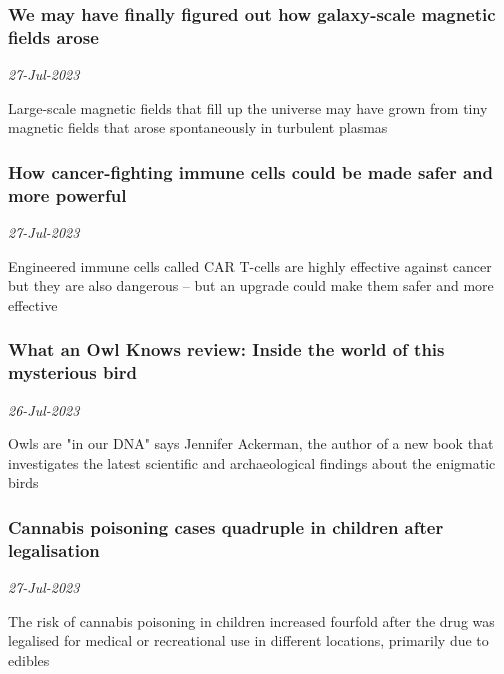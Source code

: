 \subsubsection{We may have finally figured out how galaxy-scale magnetic fields arose \href{https://www.newscientist.com/article/2384429-we-may-have-finally-figured-out-how-galaxy-scale-magnetic-fields-arose/?utm_campaign=RSS%7CNSNS&utm_source=NSNS&utm_medium=RSS&utm_content=home}{}}
\textit{27-Jul-2023}

Large-scale magnetic fields that fill up the universe may have grown from tiny magnetic fields that arose spontaneously in turbulent plasmas
\subsubsection{How cancer-fighting immune cells could be made safer and more powerful \href{https://www.newscientist.com/article/2383957-how-cancer-fighting-immune-cells-could-be-made-safer-and-more-powerful/?utm_campaign=RSS%7CNSNS&utm_source=NSNS&utm_medium=RSS&utm_content=home}{\ding{225}}}
\textit{27-Jul-2023}

Engineered immune cells called CAR T-cells are highly effective against cancer but they are also dangerous – but an upgrade could make them safer and more effective
\subsubsection{What an Owl Knows review: Inside the world of this mysterious bird \href{https://www.newscientist.com/article/mg25934490-900-what-an-owl-knows-review-inside-the-world-of-this-mysterious-bird/?utm_campaign=RSS%7CNSNS&utm_source=NSNS&utm_medium=RSS&utm_content=home}{}}
\textit{26-Jul-2023}

Owls are "in our DNA" says Jennifer Ackerman, the author of a new book that investigates the latest scientific and archaeological findings about the enigmatic birds
\subsubsection{Cannabis poisoning cases quadruple in children after legalisation \href{https://www.newscientist.com/article/2384800-cannabis-poisoning-cases-quadruple-in-children-after-legalisation/?utm_campaign=RSS%7CNSNS&utm_source=NSNS&utm_medium=RSS&utm_content=home}{\ding{225}}}
\textit{27-Jul-2023}

The risk of cannabis poisoning in children increased fourfold after the drug was legalised for medical or recreational use in different locations, primarily due to edibles
